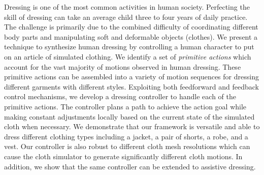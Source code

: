 Dressing is one of the most common activities in human society. Perfecting the skill of dressing can take an average child three to four years of daily practice. The challenge is primarily due to the combined difficulty of coordinating different body parts and manipulating soft and deformable objects (clothes). We present a technique to synthesize human dressing by controlling a human character to put on an article of simulated clothing. We identify a set of \emph{primitive actions} which account for the vast majority of motions observed in human dressing. These primitive actions can be assembled into a variety of motion sequences for dressing different garments with different styles. Exploiting both feedforward and feedback control mechanisms, we develop a dressing controller to handle each of the primitive actions. The controller plans a path to achieve the action goal while making constant adjustments locally based on the current state of the simulated cloth when necessary. We demonstrate that our framework is versatile and able to dress different clothing types including a jacket, a pair of shorts, a robe, and a vest. Our controller is also robust to different cloth mesh resolutions which can cause the cloth simulator to generate significantly different cloth motions. In addition, we show that the same controller can be extended to assistive dressing.

